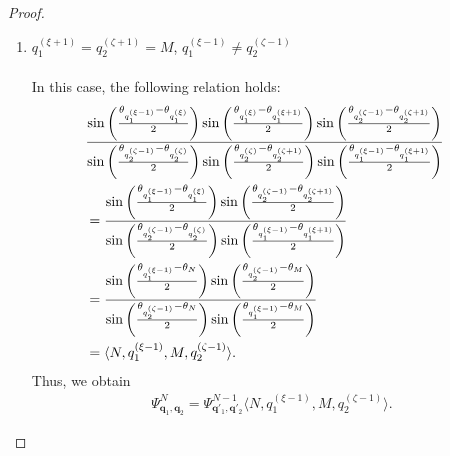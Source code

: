 \documentclass[10pt,a4paper]{amsart}
\begin{document}
\begin{proof}
\begin{enumerate}
\item[\textit{Case.3:}] ${q_1^{(\xi+1)}} = {q_2^{(\zeta+1)}} = M$, ${q_1^{(\xi-1)}} \ne {q_2^{(\zeta-1)}}$\\ \\
%
In this case, the following relation holds:
\begin{align}
    &\frac{\sin\left( \frac{\theta_{q_1^{(\xi-1)}} - \theta_{q_1^{(\xi)}}}{2} \right)\sin\left( \frac{\theta_{q_1^{(\xi)}} - \theta_{q_1^{(\xi+1)}}}{2} \right)\sin\left( \frac{\theta_{q_2^{(\zeta-1)}} - \theta_{q_2^{(\zeta+1)}}}{2} \right)}
   {\sin\left( \frac{\theta_{q_2^{(\zeta-1)}} - \theta_{q_2^{(\zeta)}}}{2} \right)\sin\left( \frac{\theta_{q_2^{(\zeta)}} - \theta_{q_2^{(\zeta+1)}}}{2} \right)\sin\left( \frac{\theta_{q_1^{(\xi-1)}} - \theta_{q_1^{(\xi+1)}}}{2} \right)}\cr
    &=\frac{\sin\left( \frac{\theta_{q_1^{(\xi-1)}} - \theta_{q_1^{(\xi)}}}{2} \right)\sin\left( \frac{\theta_{q_2^{(\zeta-1)}} - \theta_{q_2^{(\zeta+1)}}}{2} \right)}
   {\sin\left( \frac{\theta_{q_2^{(\zeta-1)}} - \theta_{q_2^{(\zeta)}}}{2} \right)\sin\left( \frac{\theta_{q_1^{(\xi-1)}} - \theta_{q_1^{(\xi+1)}}}{2} \right)}\cr
    &=\frac{\sin\left( \frac{\theta_{q_1^{(\xi-1)}} - \theta_{N}}{2} \right)\sin\left( \frac{\theta_{q_2^{(\zeta-1)}} - \theta_{M}}{2} \right)}
   {\sin\left( \frac{\theta_{q_2^{(\zeta-1)}} - \theta_{N}}{2} \right)\sin\left( \frac{\theta_{q_1^{(\xi-1)}} - \theta_{M}}{2} \right)}\cr
    &= \langle N,q_1^{(\xi-1)},M, q_2^{(\zeta-1)}\rangle.
\end{align}
Thus, we obtain
\begin{align}
    \Psi^N_{\bm{q}_1, \bm{q}_2} = \Psi^{N-1}_{\bm{q}'_1, \bm{q}'_2}\langle N,q_1^{(\xi-1)},M, q_2^{(\zeta-1)}\rangle.
\end{align}


\end{enumerate}
\end{proof}
\end{document}
